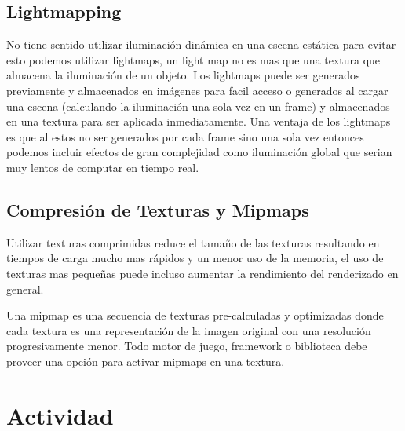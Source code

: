 \subsection{Lightmapping}
No tiene sentido utilizar iluminación dinámica en una escena estática para evitar esto podemos utilizar lightmaps, un light map no es mas que una textura que almacena la iluminación de un objeto. Los lightmaps puede ser generados previamente y almacenados en imágenes para facil acceso o generados al cargar una escena (calculando la iluminación una sola vez en un frame) y almacenados en una textura para ser aplicada inmediatamente. Una ventaja de los lightmaps es que al estos no ser generados por cada frame sino una sola vez entonces podemos incluir efectos de gran complejidad como iluminación global que serian muy lentos de computar en tiempo real.
\subsection{Compresión de Texturas y Mipmaps}
Utilizar texturas comprimidas reduce el tamaño de las texturas resultando en tiempos de carga mucho mas rápidos y un menor uso de la memoria, el uso de texturas mas pequeñas puede incluso aumentar la rendimiento del renderizado en general.

Una mipmap es una secuencia de texturas pre-calculadas y optimizadas donde cada textura es una representación de la imagen original con una resolución progresivamente menor. Todo motor de juego, framework o biblioteca debe proveer una opción para activar mipmaps en una textura.

\section{Actividad}
